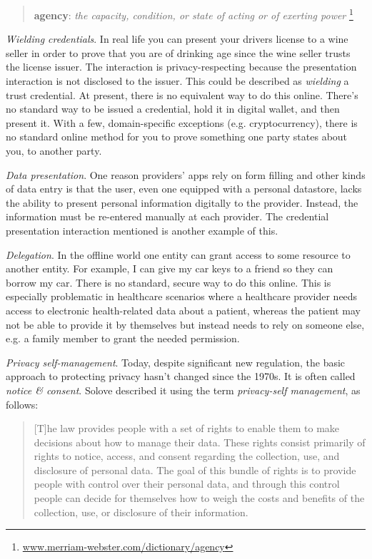 \documentclass[11pt, oneside]{article}   	%
\newcommand{\hyperfootnote}[1][]{\def\ArgI{{#1}}\hyperfootnoteRelay}
\newcommand\hyperfootnoteRelay[2][]{\href{#1#2}{\ArgI}\footnote{\href{#1#2}{#2}}}
\begin{document}
\begin{quote}
\textbf{agency}: \emph{the capacity, condition, or state of acting or of exerting power} \hyperfootnote[][https://]{www.merriam-webster.com/dictionary/agency}
\end{quote}

\emph{Wielding credentials}. In real life you can present your drivers license to a wine seller in order to prove that you are of drinking age since the wine seller trusts the license issuer. The interaction is privacy-respecting because the presentation interaction is not disclosed to the issuer. This could be described as \emph{wielding} a trust credential. At present, there is no equivalent way to do this online. There's no standard way to be issued a credential, hold it in digital wallet, and then present it. With a few, domain-specific exceptions (e.g. cryptocurrency), there is no standard online method for you to prove something one party states about you, to another party.

\emph{Data presentation}. One reason providers' apps rely on form filling and other kinds of data entry is that the user, even one equipped with a personal datastore, lacks the ability to present personal information digitally to the provider. Instead, the information must be re-entered manually at each provider. The credential presentation interaction mentioned is another example of this.

\emph{Delegation}. In the offline world one entity can grant access to some resource to another entity. For example, I can give my car keys to a friend so they can borrow my car. There is no standard, secure way to do this online. This is especially problematic in healthcare scenarios where a healthcare provider needs access to electronic health-related data about a patient, whereas the patient may not be able to provide it by themselves but instead needs to rely on someone else, e.g. a family member to grant the needed permission.

\emph{Privacy self-management}. Today, despite significant new regulation, the basic approach to protecting privacy hasn't changed since the 1970s. It is often called \emph{notice \& consent}. Solove described it using the term \emph{privacy-self management}\cite{Solove2012}, as follows:

\begin{quote}
	[T]he law provides people with a set of rights to enable them to make decisions about how to manage their data.  These rights consist primarily of rights to notice, access, and consent regarding the collection, use, and disclosure of personal data. The goal of this bundle of rights is to provide people with control over their  personal data, and through this  control people can decide for themselves how to weigh the costs and benefits of the collection, use, or disclosure of their information.
\end{quote} 
\end{document}
